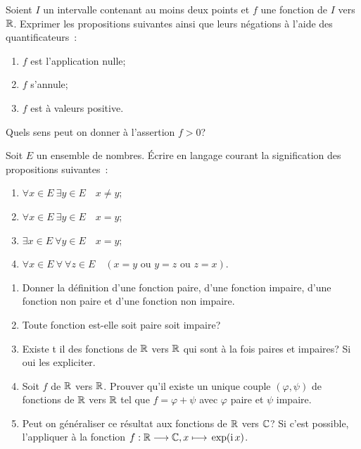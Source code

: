 \begin{exercice}
  Soient \(I\) un intervalle contenant au moins deux points et \(f\) une
  fonction de \(I\) vers \(\mathbb{R}\). Exprimer les propositions suivantes ainsi que
  leurs négations à l'aide des quantificateurs~:
  \begin{enumerate}
    \item \(f\) est l'application nulle;
    \item \(f\) s'annule;
    \item \(f\) est à valeurs positive.
  \end{enumerate}
  Quels sens peut on donner à l'assertion \(f>0\)?
\end{exercice}

\begin{exercice}
  Soit \(E\) un ensemble de nombres. Écrire en langage courant la signification
  des propositions suivantes~:
  \begin{enumerate}
    \item \(\forall x \in E \ \exists y \in E \quad x \neq y\);
    \item \(\forall x \in E \ \exists y \in E \quad x = y\);
    \item \(\exists x \in E \ \forall y \in E \quad x = y\);
    \item \(\forall x \in E \ \forall \ \forall z \in E \quad (x=y \textrm{~ou~}
      y=z \textrm{~ou~} z=x)\).
  \end{enumerate}
\end{exercice}

\begin{exercice}
  \begin{enumerate}
    \item Donner la définition d'une fonction paire, d'une fonction impaire,
      d'une fonction non paire et d'une fonction non impaire.
    \item Toute fonction est-elle soit paire soit impaire?
    \item Existe t il des fonctions de \(\mathbb{R}\) vers \(\mathbb{R}\) qui sont à la fois
      paires  et impaires? Si oui les expliciter.
    \item Soit \(f\) de \(\mathbb{R}\) vers \(\mathbb{R}\). Prouver qu'il existe un unique
      couple \((\varphi, \psi)\) de fonctions de \(\mathbb{R}\) vers \(\mathbb{R}\) tel que
      \(f=\varphi+\psi\) avec \(\varphi\) paire et \(\psi\) impaire.
    \item Peut on généraliser ce résultat aux fonctions de \(\mathbb{R}\) vers \(\mathbb{C}\)?
      Si c'est possible, l'appliquer à la fonction
      \(f:\mathbb{R} \longrightarrow{} \mathbb{C}, x \longmapsto{} \exp(\operatorname{i} x)\).
  \end{enumerate}
\end{exercice}

